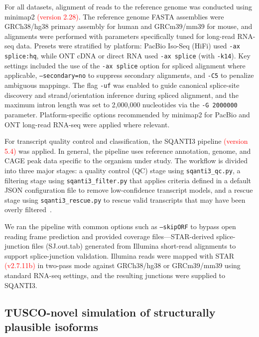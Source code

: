 \documentclass[pdflatex,sn-nature]{sn-jnl}%
\newcommand{\tuscoNovel}{TUSCO-novel}
\begin{document}
For all datasets, alignment of reads to the reference genome was conducted using minimap2 \textcolor{red}{(version 2.28)}. The reference genome FASTA assemblies were GRCh38/hg38 primary assembly for human and GRCm39/mm39 for mouse, and alignments were performed with parameters specifically tuned for long-read RNA-seq data. Presets were stratified by platform: PacBio Iso-Seq (HiFi) used \texttt{-ax splice:hq}, while ONT cDNA or direct RNA used \texttt{-ax splice} (with \texttt{-k14}). Key settings included the use of the \texttt{-ax splice} option for spliced alignment where applicable, \texttt{--secondary=no} to suppress secondary alignments, and \texttt{-C5} to penalize ambiguous mappings. The flag \texttt{-uf} was enabled to guide canonical splice-site discovery and strand/orientation inference during spliced alignment, and the maximum intron length was set to 2,000,000 nucleotides via the \texttt{-G 2000000} parameter. Platform-specific options recommended by minimap2 for PacBio and ONT long-read RNA-seq were applied where relevant.

For transcript quality control and classification, the SQANTI3 pipeline \textcolor{red}{(version 5.4)} was applied. In general, the pipeline uses reference annotation, genome, and CAGE peak data specific to the organism under study. The workflow is divided into three major stages: a quality control (QC) stage using \texttt{sqanti3\_qc.py}, a filtering stage using \texttt{sqanti3\_filter.py} that applies criteria defined in a default JSON configuration file to remove low-confidence transcript models, and a rescue stage using \texttt{sqanti3\_rescue.py} to rescue valid transcripts that may have been overly filtered~\cite{pardo-palacios_sqanti3_2024}.

We ran the pipeline with common options such as \texttt{--skipORF} to bypass open reading frame prediction and provided coverage files---STAR-derived splice-junction files (SJ.out.tab) generated from Illumina short-read alignments to support splice-junction validation. Illumina reads were mapped with STAR \textcolor{red}{(v2.7.11b)} in two-pass mode against GRCh38/hg38 or GRCm39/mm39 using standard RNA-seq settings, and the resulting junctions were supplied to SQANTI3.

\subsection{\tuscoNovel{} simulation of structurally plausible isoforms}
\end{document}
